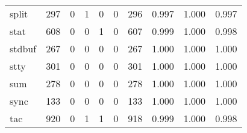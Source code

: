 \begin{longtable}{lp{1.3cm}p{1.3cm}p{1.3cm}p{1.3cm}p{1.3cm}p{1.3cm}p{1.3cm}p{1.3cm}p{1.3cm}}
split     &                    297 &                                  0 &                                 1 &                                0 &                                 0 &                             296 &                                   0.997 &                                  1.000 &                                0.997 \\
stat      &                    608 &                                  0 &                                 0 &                                1 &                                 0 &                             607 &                                   0.999 &                                  1.000 &                                0.998 \\
stdbuf    &                    267 &                                  0 &                                 0 &                                0 &                                 0 &                             267 &                                   1.000 &                                  1.000 &                                1.000 \\
stty      &                    301 &                                  0 &                                 0 &                                0 &                                 0 &                             301 &                                   1.000 &                                  1.000 &                                1.000 \\
sum       &                    278 &                                  0 &                                 0 &                                0 &                                 0 &                             278 &                                   1.000 &                                  1.000 &                                1.000 \\
sync      &                    133 &                                  0 &                                 0 &                                0 &                                 0 &                             133 &                                   1.000 &                                  1.000 &                                1.000 \\
tac       &                    920 &                                  0 &                                 1 &                                1 &                                 0 &                             918 &                                   0.999 &                                  1.000 &                                0.998 \\

\end{longtable}
